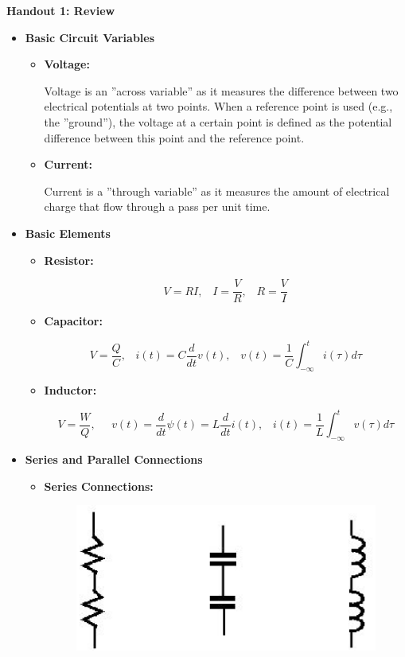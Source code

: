 \documentclass[12pt]{article}
\begin{document}
\begin{center}
{\huge {\bf Handout 1: Review} }
\end{center}

\begin{itemize}

\item {\bf Basic Circuit Variables}
  \begin{itemize}
    \item {\bf Voltage:}

      Voltage is an ''across variable'' as it measures the difference between two electrical
      potentials at two points. When a reference point is used (e.g., the ''ground''), the
      voltage at a certain point is defined as the potential difference between this point
      and the reference point.

    \item {\bf Current:}

      Current is a ''through variable'' as it measures the amount of electrical charge that
      flow through a pass per unit time.

  \end{itemize}


\item {\bf Basic Elements}

  \begin{itemize}
  \item {\bf Resistor:}

    \[ V=RI,\;\;\;I=\frac{V}{R},\;\;\;R=\frac{V}{I} \]

  \item {\bf Capacitor:}

    \[ V=\frac{Q}{C}, \;\;\;i(t)=C\frac{d}{dt} v(t),\;\;\;
    v(t)=\frac{1}{C}\int_{-\infty}^t i(\tau) d\tau \]

  \item {\bf Inductor:}

    \[ V=\frac{W}{Q},\;\;\;\;\;v(t)=\frac{d}{dt} \psi(t)=L\frac{d}{dt} i(t),\;\;\;
    i(t)=\frac{1}{L}\int_{-\infty}^t v(\tau) d\tau \]

  \end{itemize}

\item {\bf Series and Parallel Connections}

  \begin{itemize}
  \item {\bf Series Connections:}
    \begin{figure}[hb]
      \includegraphics[scale=0.5]{figures/series_connections.eps}
    \end{figure}
	

\end{itemize}
\end{itemize}
\end{document}
